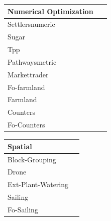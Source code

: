 \documentclass[a4paper]{article}
\begin{document}
    \begin{table}[H]
    \centering
    \renewcommand{\arraystretch}{1.5} 

    \begin{minipage}[t]{0.31\textwidth}
        \centering
        \begin{tabular}[t]{ >{\centering\arraybackslash}p{0.9\linewidth} }
            \toprule
            \textbf{Numerical Optimization}\\
            \midrule[1pt]
            \addlinespace[0.15cm]
            Settlersnumeric\\
            \midrule
            Sugar\\
            \midrule
            Tpp\\
            \midrule
            Pathwaysmetric\\
            \midrule
            Markettrader\\
            \midrule
            Fo-farmland\\
            \midrule
            Farmland\\
            \midrule
            Counters\\
            \midrule
            Fo-Counters\\
            \bottomrule
        \end{tabular}
    \end{minipage}%
    \hfill %
    \begin{minipage}[t]{0.31\textwidth}
        \centering
        \begin{tabular}[t]{ >{\centering\arraybackslash}p{0.9\linewidth} }
            \toprule
            \textbf{Spatial}\\
            \midrule[1pt]
            \addlinespace[0.15cm]
            Block-Grouping\\
            \midrule
            Drone\\
            \midrule
            Ext-Plant-Watering\\
            \midrule
            Sailing\\
            \midrule
            Fo-Sailing\\
            \bottomrule
        \end{tabular}
    \end{minipage}%
    \hfill %

\end{table}
\end{document}
